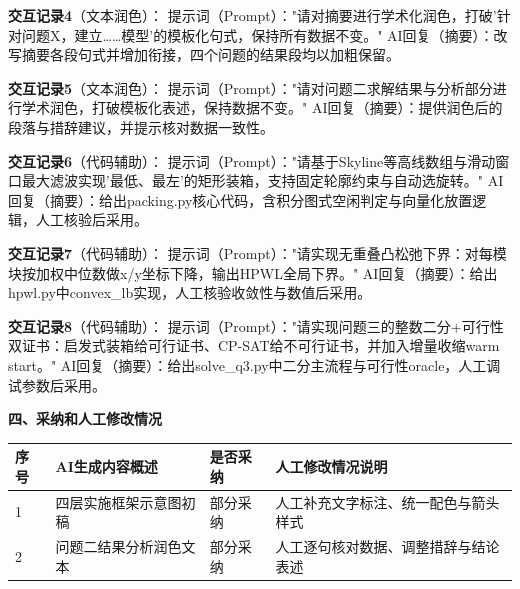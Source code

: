 \documentclass{JXUSTmodeling}
\begin{document}
\begin{appendixx}
  \textbf{交互记录4}（文本润色）：\newline
  提示词（Prompt）："请对摘要进行学术化润色，打破'针对问题X，建立……模型'的模板化句式，保持所有数据不变。"\newline
  AI回复（摘要）：改写摘要各段句式并增加衔接，四个问题的结果段均以加粗保留。

  \textbf{交互记录5}（文本润色）：\newline
  提示词（Prompt）："请对问题二求解结果与分析部分进行学术润色，打破模板化表述，保持数据不变。"\newline
  AI回复（摘要）：提供润色后的段落与措辞建议，并提示核对数据一致性。

  \textbf{交互记录6}（代码辅助）：\newline
  提示词（Prompt）："请基于Skyline等高线数组与滑动窗口最大滤波实现'最低、最左'的矩形装箱，支持固定轮廓约束与自动选旋转。"\newline
  AI回复（摘要）：给出packing.py核心代码，含积分图式空闲判定与向量化放置逻辑，人工核验后采用。

  \textbf{交互记录7}（代码辅助）：\newline
  提示词（Prompt）："请实现无重叠凸松弛下界：对每模块按加权中位数做x/y坐标下降，输出HPWL全局下界。"\newline
  AI回复（摘要）：给出hpwl.py中convex\_lb实现，人工核验收敛性与数值后采用。

  \textbf{交互记录8}（代码辅助）：\newline
  提示词（Prompt）："请实现问题三的整数二分+可行性双证书：启发式装箱给可行证书、CP-SAT给不可行证书，并加入增量收缩warm start。"\newline
  AI回复（摘要）：给出solve\_q3.py中二分主流程与可行性oracle，人工调试参数后采用。

  \textbf{四、采纳和人工修改情况}

  \begin{tabular}{llll}
  	\toprule[1.5pt]
  	序号&AI生成内容概述&是否采纳&人工修改情况说明\\
  	\midrule
  	1&四层实施框架示意图初稿&部分采纳&人工补充文字标注、统一配色与箭头样式\\
  	2&问题二结果分析润色文本&部分采纳&人工逐句核对数据、调整措辞与结论表述\\
  	\bottomrule[1.5pt]
  \end{tabular}
\end{appendixx}
\end{document}
